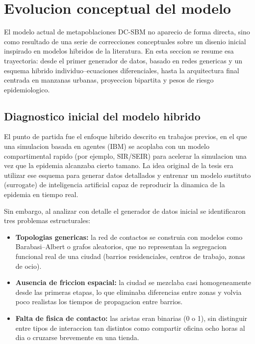 \section{Evolucion conceptual del modelo}

El modelo actual de metapoblaciones DC-SBM no aparecio de forma directa, sino como resultado de una serie de correcciones conceptuales sobre un disenio inicial inspirado en modelos hibridos de la literatura. En esta seccion se resume esa trayectoria: desde el primer generador de datos, basado en redes genericas y un esquema hibrido individuo–ecuaciones diferenciales, hasta la arquitectura final centrada en manzanas urbanas, proyeccion bipartita y pesos de riesgo epidemiologico.

\subsection{Diagnostico inicial del modelo hibrido}

El punto de partida fue el enfoque hibrido descrito en trabajos previos, en el que una simulacion basada en agentes (IBM) se acoplaba con un modelo compartimental rapido (por ejemplo, SIR/SEIR) para acelerar la simulacion una vez que la epidemia alcanzaba cierto tamano. La idea original de la tesis era utilizar ese esquema para generar datos detallados y entrenar un modelo sustituto (surrogate) de inteligencia artificial capaz de reproducir la dinamica de la epidemia en tiempo real.

Sin embargo, al analizar con detalle el generador de datos inicial se identificaron tres problemas estructurales:

\begin{itemize}
    \item \textbf{Topologias genericas:} la red de contactos se construia con modelos como Barabasi–Albert o grafos aleatorios, que no representan la segregacion funcional real de una ciudad (barrios residenciales, centros de trabajo, zonas de ocio).
    \item \textbf{Ausencia de friccion espacial:} la ciudad se mezclaba casi homogeneamente desde las primeras etapas, lo que eliminaba diferencias entre zonas y volvia poco realistas los tiempos de propagacion entre barrios.
    \item \textbf{Falta de fisica de contacto:} las aristas eran binarias (0 o 1), sin distinguir entre tipos de interaccion tan distintos como compartir oficina ocho horas al dia o cruzarse brevemente en una tienda.
\end{itemize}

